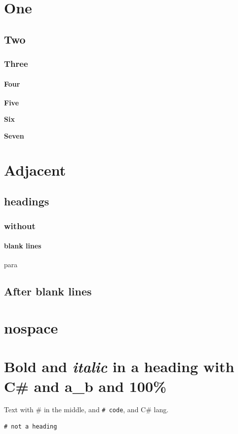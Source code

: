 \chapter{One}
\section{Two}
\subsection{Three}
\subsubsection{Four}

\textbf{Five}

\textbf{Six}

\textbf{Seven}

\chapter{Adjacent}
\section{headings}
\subsection{without}
\subsubsection{blank lines}

para
\section{After blank lines}

\chapter{nospace}

\chapter{\textbf{Bold} and \textit{italic} in a heading with C\# and a\_b and 100\%}

Text with \# in the middle, and \texttt{# code}, and C\# lang.

\begin{listing}[H]
\begin{verbatim}
# not a heading
\end{verbatim}
\end{listing}

